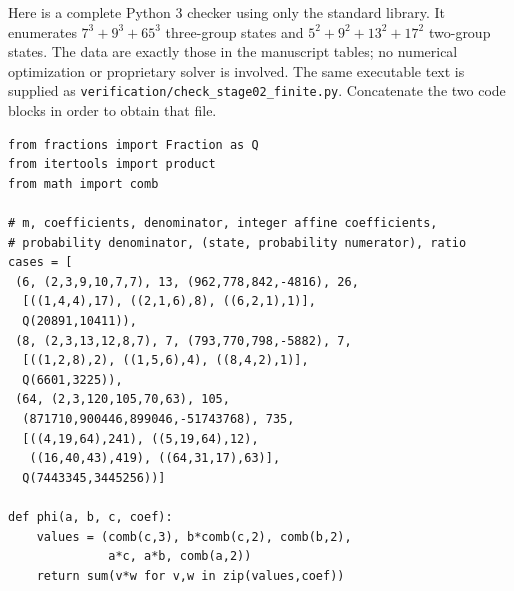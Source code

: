 \newpage
Here is a complete Python 3 checker using only the standard library.
It enumerates $7^3+9^3+65^3$ three-group states and
$5^2+9^2+13^2+17^2$ two-group
states. The data are exactly those in the manuscript tables; no numerical
optimization or proprietary solver is involved. The same executable text
is supplied as \texttt{verification/check\_stage02\_finite.py}.
Concatenate the two code blocks in order to obtain that file.
\par\noindent\begin{minipage}{\textwidth}\small
\begin{verbatim}
from fractions import Fraction as Q
from itertools import product
from math import comb

# m, coefficients, denominator, integer affine coefficients,
# probability denominator, (state, probability numerator), ratio
cases = [
 (6, (2,3,9,10,7,7), 13, (962,778,842,-4816), 26,
  [((1,4,4),17), ((2,1,6),8), ((6,2,1),1)],
  Q(20891,10411)),
 (8, (2,3,13,12,8,7), 7, (793,770,798,-5882), 7,
  [((1,2,8),2), ((1,5,6),4), ((8,4,2),1)],
  Q(6601,3225)),
 (64, (2,3,120,105,70,63), 105,
  (871710,900446,899046,-51743768), 735,
  [((4,19,64),241), ((5,19,64),12),
   ((16,40,43),419), ((64,31,17),63)],
  Q(7443345,3445256))]

def phi(a, b, c, coef):
    values = (comb(c,3), b*comb(c,2), comb(b,2),
              a*c, a*b, comb(a,2))
    return sum(v*w for v,w in zip(values,coef))

\end{verbatim}
\end{minipage}
\newpage
